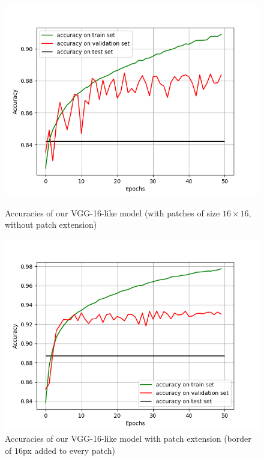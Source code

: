 \documentclass[10pt,conference,compsocconf]{IEEEtran}
\begin{document}
\begin{figure}[h]
	\centering
	\begin{minipage}[b]{0.48\linewidth}
		\includegraphics[width=\textwidth]{CNN_with_border_0.png}
		\captionsetup{aboveskip=0.3cm,justification=centering, margin=0.1cm, labelfont=footnotesize, textfont=footnotesize}
		\caption{Accuracies of our VGG-16-like model (with patches of size $16 \times 16$, without patch extension)}
		\label{fig:noExtensions}
	\end{minipage}
	\hspace{0.05cm}
	\begin{minipage}[b]{0.48\linewidth}
		\includegraphics[width=\textwidth]{CNN_with_border_16.png}
		\captionsetup{aboveskip=0.1cm,justification=centering, margin=0.1cm, labelfont=footnotesize, textfont=footnotesize}
		\caption{Accuracies of our VGG-16-like model with patch extension (border of $16$px added to every patch)}
		\label{fig:extensions}
	\end{minipage}
\end{figure}
\end{document}
